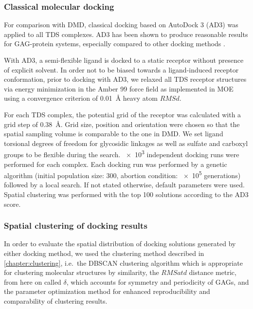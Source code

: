 \subsubsection{Classical molecular docking}

For comparison with DMD, classical docking based on AutoDock
3 \cite{Morris1998} (AD3) was applied to all TDS complexes. AD3 has
been shown to produce reasonable results for GAG-protein systems, especially
compared to other docking methods \cite{japan_docking_ad3_clustering,
samsonov_docking_2011,pichert_characterization_2012,
imberty_perez_protgag_comp_book_2006,franz_cathepsin_2013}.

With AD3, a semi-flexible ligand is docked to a static receptor without presence
of explicit solvent. In order not to be biased towards a ligand-induced receptor
conformation, prior to docking with AD3, we relaxed all TDS receptor structures
via energy minimization in the Amber 99 force field as implemented in MOE
\cite{chemical_computing_group_inc_moe_2010} using a convergence criterion of
\SI{0.01}{\angstrom} heavy atom $RMSd$.

For each TDS complex, the potential grid of the receptor was calculated with a
grid step of \SI{0.38}{\angstrom}. Grid size, position and orientation were
chosen so that the spatial sampling volume is comparable to the one in DMD. We
set ligand torsional degrees of freedom for glycosidic linkages as well as
sulfate and carboxyl groups to be flexible during the search. \num{e3}
independent docking runs were performed for each complex. Each docking run was
performed by a genetic algorithm (initial population size: 300, abortion
condition: \num{e5} generations) followed by a local search. If not stated
otherwise, default parameters were used. Spatial clustering was performed with
the top 100 solutions according to the AD3 score.

\subsubsection{Spatial clustering of docking results}
\label{dmd:clustering_method}

In order to evaluate the spatial distribution of docking solutions generated by
either docking method, we used the clustering method described in
\cref{chapter:clustering}, i.e.\ the DBSCAN clustering algorithm
\cite{dbscan_ester1996} which is appropriate for clustering molecular structures
by similarity, the $RMSatd$ distance metric, from here on called $\delta$, which
accounts for symmetry and periodicity of GAGs, and the parameter optimization
method for enhanced reproducibility and comparability of clustering results.

